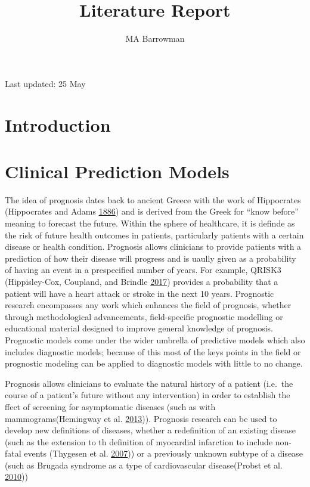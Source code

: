 \documentclass[
]{article}
\title{Literature Report}
\author{MA Barrowman}
\date{}
\begin{document}
\maketitle

{
\setcounter{tocdepth}{2}
\tableofcontents
}
Last updated: 25 May

\hypertarget{introduction}{%
\section{Introduction}\label{introduction}}

\hypertarget{clinical-prediction-models}{%
\section{Clinical Prediction Models}\label{clinical-prediction-models}}

The idea of prognosis dates back to ancient Greece with the work of Hippocrates (Hippocrates and Adams \protect\hyperlink{ref-hippocrates_genuine_1886}{1886}) and is derived from the Greek for ``know before'' meaning to forecast the future. Within the sphere of healthcare, it is definde as the risk of future health outcomes in patients, particularly patients with a certain disease or health condition. Prognosis allows clinicians to provide patients with a prediction of how their disease will progress and is uaully given as a probability of having an event in a prespecified number of years. For example, QRISK3 (Hippisley-Cox, Coupland, and Brindle \protect\hyperlink{ref-hippisley-cox_development_2017}{2017}) provides a probability that a patient will have a heart attack or stroke in the next 10 years. Prognostic research encompasses any work which enhances the field of prognosis, whether through methodological advancements, field-specific prognostic modelling or educational material designed to improve general knowledge of prognosis. Prognostic models come under the wider umbrella of predictive models which also includes diagnostic models; because of this most of the keys points in the field or prognostic modeling can be applied to diagnostic models with little to no change.

Prognosis allows clinicians to evaluate the natural history of a patient (i.e.~the course of a patient's future without any intervention) in order to establish the ffect of screening for asymptomatic diseases (such as with mammograms(Hemingway et al. \protect\hyperlink{ref-hemingway_prognosis_2013}{2013})). Prognosis research can be used to develop new definitions of diseases, whether a redefinition of an existing disease (such as the extension to th definition of myocardial infarction to include non-fatal events (Thygesen et al. \protect\hyperlink{ref-thygesen_universal_2007}{2007})) or a previously unknown subtype of a disease (such as Brugada syndrome as a type of cardiovascular disease(Probst et al. \protect\hyperlink{ref-probst_long-term_2010}{2010}))
\end{document}
